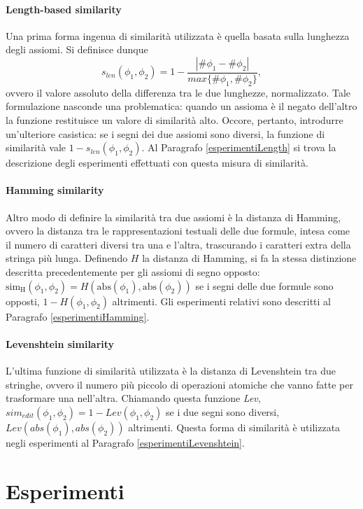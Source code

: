 \documentclass[12pt,a4paper]{report}
\begin{document}
\subsubsection{Length-based similarity}
\label{lengthSection}
Una prima forma ingenua di similarità utilizzata è quella basata sulla lunghezza degli assiomi.
Si definisce dunque
\[ s_{len}(\phi_1, \phi_2) = 1 - \frac{|\# \phi_1 - \# \phi_2|}{max\{\#\phi_1, \#\phi_2\}},\]
ovvero il valore assoluto della differenza tra le due lunghezze, normalizzato.
Tale formulazione nasconde una problematica: quando un assioma è il negato dell'altro la funzione restituisce un valore di similarità alto. Occore, pertanto, introdurre un'ulteriore casistica: se i segni dei due assiomi sono diversi, la funzione di similarità vale $1 - s_{len}(\phi_1,\phi_2)$. Al Paragrafo \ref{esperimentiLength} si trova la descrizione degli esperimenti effettuati con questa misura di similarità.

\subsubsection{Hamming similarity}
\label{hammingSection}
Altro modo di definire la similarità tra due assiomi è la distanza di Hamming, ovvero la distanza tra le rappresentazioni testuali delle due formule, intesa come il numero di caratteri diversi tra una e l'altra, trascurando i caratteri extra della stringa più lunga.
Definendo $H$ la distanza di Hamming, si fa la stessa distinzione descritta precedentemente per gli assiomi di segno opposto:  $ \mathrm{sim_{H}}(\phi_1, \phi_2) = H(\mathrm{abs}(\phi_1),\mathrm{abs}(\phi_2))$ se i segni delle due formule sono opposti, $1 - H(\phi_1, \phi_2)$ altrimenti. Gli esperimenti relativi sono descritti al Paragrafo \ref{esperimentiHamming}.

\subsubsection{Levenshtein similarity}
\label{levenshteinSection}
L'ultima funzione di similarità utilizzata è la distanza di Levenshtein tra due stringhe, ovvero il numero più piccolo di operazioni atomiche che vanno fatte per trasformare una nell'altra. Chiamando questa funzione \emph{Lev}, $sim_{edit}(\phi_1, \phi_2) = 1 - Lev(\phi_1,\phi_2)$ se i due segni sono diversi, $Lev(abs(\phi_1),abs(\phi_2))$ altrimenti. Questa forma di similarità è utilizzata negli esperimenti al Paragrafo  \ref{esperimentiLevenshtein}.


\chapter{Esperimenti}\label{capitoloEsperimenti}
\end{document}
